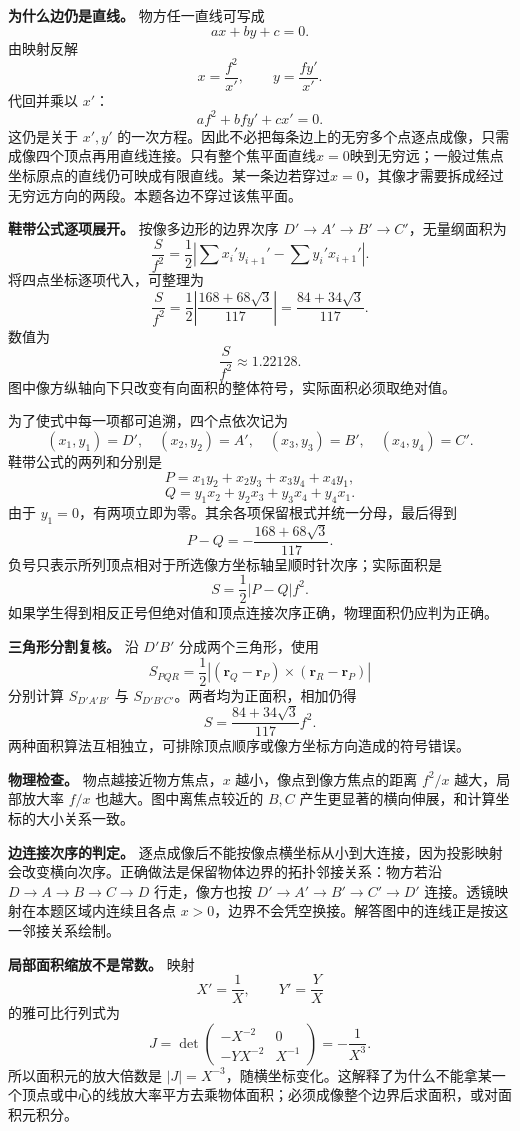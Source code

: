 \documentclass[12pt,a4paper,UTF8]{ctexart}
\begin{document}
\textbf{为什么边仍是直线。} 物方任一直线可写成 \[
ax+by+c=0.
\] 由映射反解 \[
x=\frac{f^2}{x'},\qquad
y=\frac{fy'}{x'}.
\] 代回并乘以 \(x'\)： \[
af^2+bfy'+cx'=0.
\] 这仍是关于 \(x',y'\)
的一次方程。因此不必把每条边上的无穷多个点逐点成像，只需成像四个顶点再用直线连接。只有整个焦平面直线\(x=0\)映到无穷远；一般过焦点坐标原点的直线仍可映成有限直线。某一条边若穿过\(x=0\)，其像才需要拆成经过无穷远方向的两段。本题各边不穿过该焦平面。

\textbf{鞋带公式逐项展开。} 按像多边形的边界次序
\(D'\to A'\to B'\to C'\)，无量纲面积为 \[
\frac S{f^2}
=\frac12\left|
\sum x_i'y_{i+1}'-
\sum y_i'x_{i+1}'
\right|.
\] 将四点坐标逐项代入，可整理为 \[
\frac S{f^2}
=\frac12\left|
\frac{168+68\sqrt3}{117}
\right|
=\frac{84+34\sqrt3}{117}.
\] 数值为 \[
\frac S{f^2}\approx1.22128.
\] 图中像方纵轴向下只改变有向面积的整体符号，实际面积必须取绝对值。

为了使式中每一项都可追溯，四个点依次记为 \[
(x_1,y_1)=D',\quad (x_2,y_2)=A',\quad
(x_3,y_3)=B',\quad (x_4,y_4)=C'.
\] 鞋带公式的两列和分别是 \[
P=x_1y_2+x_2y_3+x_3y_4+x_4y_1,
\] \[
Q=y_1x_2+y_2x_3+y_3x_4+y_4x_1.
\] 由于 \(y_1=0\)，有两项立即为零。其余各项保留根式并统一分母，最后得到
\[
P-Q=-\frac{168+68\sqrt3}{117}.
\] 负号只表示所列顶点相对于所选像方坐标轴呈顺时针次序；实际面积是 \[
S=\frac12|P-Q|f^2.
\]
如果学生得到相反正号但绝对值和顶点连接次序正确，物理面积仍应判为正确。

\textbf{三角形分割复核。} 沿 \(D'B'\) 分成两个三角形，使用 \[
S_{PQR}=\frac12
\left|(\bm r_Q-\bm r_P)\times
(\bm r_R-\bm r_P)\right|
\] 分别计算 \(S_{D'A'B'}\) 与 \(S_{D'B'C'}\)。两者均为正面积，相加仍得
\[
S=\frac{84+34\sqrt3}{117}f^2.
\] 两种面积算法互相独立，可排除顶点顺序或像方坐标方向造成的符号错误。

\textbf{物理检查。} 物点越接近物方焦点，\(x\) 越小，像点到像方焦点的距离
\(f^2/x\) 越大，局部放大率 \(f/x\) 也越大。图中离焦点较近的 \(B,C\)
产生更显著的横向伸展，和计算坐标的大小关系一致。

\textbf{边连接次序的判定。}
逐点成像后不能按像点横坐标从小到大连接，因为投影映射会改变横向次序。正确做法是保留物体边界的拓扑邻接关系：物方若沿
\(D\to A\to B\to C\to D\) 行走，像方也按 \(D'\to A'\to B'\to C'\to D'\)
连接。透镜映射在本题区域内连续且各点
\(x>0\)，边界不会凭空换接。解答图中的连线正是按这一邻接关系绘制。

\textbf{局部面积缩放不是常数。} 映射 \[
X'=\frac1X,\qquad Y'=\frac YX
\] 的雅可比行列式为 \[
J=\det
\begin{pmatrix}
-X^{-2}&0\\
-YX^{-2}&X^{-1}
\end{pmatrix}
=-\frac1{X^3}.
\] 所以面积元的放大倍数是
\(|J|=X^{-3}\)，随横坐标变化。这解释了为什么不能拿某一个顶点或中心的线放大率平方去乘物体面积；必须成像整个边界后求面积，或对面积元积分。
\end{document}
